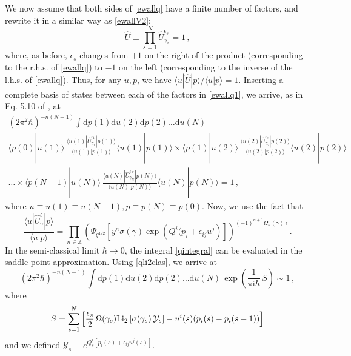 \documentclass[12pt,reqno]{article}
\numberwithin{equation}{section}
\newcommand{\be}{\begin{equation}}
\newcommand{\ee}{\end{equation}}
\def\[{\left[}
\def\]{\right]}
\def\eps{\varepsilon}
\newcommand{\de}{\mathrm{d}}
\newcommand{\I}{\mathrm{i}}
\newcommand{\cY}{\mathcal{Y}}
\newcommand{\unit}{{\mathrm{1}}}
\newcommand{\IZ}{\mathbb{Z}}
\def\eps{\epsilon}
\def\qli2#1{\Psi_{#1}}
\def\ind{s}
\numberwithin{equation}{section}
\begin{document}
We now assume that both sides of \eqref{ewallq} have a finite number of factors, and
rewrite it in a similar way as \eqref{ewallV2}:
\be
\label{ewallq1}
\hat U \equiv \prod_{\ind=1}^N \hat U_{\gamma_\ind }^{\eps_\ind} = \unit \, ,
\ee
where, as before, $\eps_\ind$ changes from $+1$ on the right of the product (corresponding to the r.h.s.
of \eqref{ewallq}) to $-1$ on the left (corresponding to the inverse of the l.h.s. of \eqref{ewallq}).
Thus, for any $u,p$, we have $\langle u | \hat U | p \rangle/\langle u | p \rangle=1$.
Inserting a complete basis of states between each of the factors in \eqref{ewallq1},
we arrive, as in Eq. 5.10 of  \cite{Kashaev:2011}, at
\be
\begin{split}
(2\pi^2\hbar)^{-n(N-1)} \int \de p(1) \de u(2)
\de p(2)  \dots  \de u(N) \\
\langle p(0)|u(1)\rangle \,
\frac{\langle u(1)|\hat U_{\gamma_{1} }^{\eps_1} |p(1)\rangle}{\langle u(1)|p(1)\rangle}
\langle u(1)|p(1)\rangle \times
\langle p(1)|u(2)\rangle \,
\frac{\langle u(2)| \hat U_{\gamma_{2} }^{\eps_\ind} |p(2)\rangle}{\langle u(2)|p(2)\rangle}
\langle u(2)|p(2)\rangle \\
 \dots
\times \langle p(N-1)|u(N)\rangle \,
\frac{\langle u(N)| \hat U_{\gamma_{N} }^{\eps_N}  |p(N)\rangle}{\langle u(N)|p(N)\rangle}
 \langle u(N)|p(N)\rangle = 1\, ,
\end{split}
\label{qintegral}
\ee
where  $u\equiv u(1)\equiv u(N+1), p\equiv p(N)\equiv p(0)$. Now, we use the fact that
\be
\frac{\langle u | \hat U_{\gamma}^\eps  | p\rangle}
{\langle u | p \rangle}
= \prod_{n\in\IZ}  \left( \qli2{q^{1/2}}\left[  y^n
\sigma(\gamma) \exp\left( Q^i ( p_i + \epsilon_{ij} u^j  \right) \right]\right)^{(-1)^{n+1} \Omega_n(\gamma)\, \eps}\, .
\ee
In the semi-classical limit $\hbar\to 0$, the integral \eqref{qintegral} can be evaluated in the saddle point
approximation. Using \eqref{qli2clas}, we arrive at
\be
(2\pi^2\hbar)^{-n(N-1)} \int \de p(1) \de u(2)
\de p(2)  \dots  \de u(N) \, \exp\left( \frac{1}{\pi\I\hbar}\, S \right)\sim 1\, ,
\ee
where
\be
S=\sum_{s=1}^{N} \left[ \frac{\epsilon_s}{2} \, \Omega(\gamma_{s} )
{\rm Li_2}\left[ \sigma(\gamma_{s} )\,  \cY_s \right] -u^i(s) ( p_i(s) - p_i(s-1)) \right]
\ee
and we defined $\cY_s\equiv e^{Q^i_s \[p_i(s) + \epsilon_{ij} u^j(s)\]}$.
\end{document}
